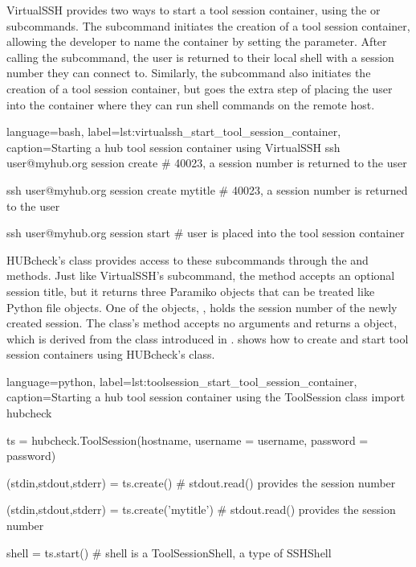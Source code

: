 VirtualSSH provides two ways to start a tool session container, using the
 or  subcommands.
The  subcommand initiates the creation of a tool
session container, allowing the developer to name the container by setting the
 parameter.  After calling the
 subcommand, the user is returned to their local
shell with a session number they can connect to.  Similarly, the
 subcommand also initiates the creation of a tool
session container, but goes the extra step of placing the user into the
container where they can run shell commands on the remote host.

\begin{xcode}{%
  language=bash,%
  label=lst:virtualssh_start_tool_session_container,%
  caption={Starting a hub tool session container using VirtualSSH}%
}
ssh user@myhub.org session create
# 40023, a session number is returned to the user

ssh user@myhub.org session create mytitle
# 40023, a session number is returned to the user

ssh user@myhub.org session start
# user is placed into the tool session container
\end{xcode}

HUBcheck's  class provides access to these subcommands
through the  and  methods. Just like
VirtualSSH's  subcommand, the 
method accepts an optional session title, but it returns three Paramiko
 objects that can be treated like Python file objects. One
of the  objects, , holds the session
number of the newly created session. The  class's
 method accepts no arguments and returns a
 object, which is derived from the 
class introduced in .
 shows how to create and
start tool session containers using HUBcheck's  class.

\begin{xcode}{%
  language=python,%
  label=lst:toolsession_start_tool_session_container,%
  caption={Starting a hub tool session container using the ToolSession class}%
}
import hubcheck

ts = hubcheck.ToolSession(hostname,
                          username = username,
                          password = password)

(stdin,stdout,stderr) = ts.create()
# stdout.read() provides the session number

(stdin,stdout,stderr) = ts.create('mytitle')
# stdout.read() provides the session number

shell = ts.start()
# shell is a ToolSessionShell, a type of SSHShell
\end{xcode}


